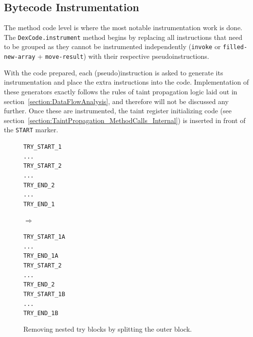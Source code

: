 \documentclass[12pt,twoside,notitlepage]{report}
\newcommand{\asm}[1] {\texttt{#1}}
\begin{document}
\subsection{Bytecode Instrumentation}

The method code level is where the most notable instrumentation work is done. The \verb$DexCode.instrument$ method begins by replacing all instructions that need to be grouped as they cannot be instrumented independently (\verb$invoke$ or \verb$filled-new-array$ + \verb$move-result$) with their respective pseudoinstructions. 

With the code prepared, each (pseudo)instruction is asked to generate its instrumentation and place the extra instructions into the code. Implementation of these generators exactly follows the rules of taint propagation logic laid out in section~\ref{section:DataFlowAnalysis}, and therefore will not be discussed any further. Once these are instrumented, the taint register initializing code (see section~\ref{section:TaintPropagation_MethodCalls_Internal}) is inserted in front of the \verb$START$ marker.

\begin{figure}
	\centering
	\begin{minipage}{0.165\textwidth}
		\asm{TRY\_START\_1} \\
		\asm{...} \\
		\asm{TRY\_START\_2} \\
		\asm{...} \\
		\asm{TRY\_END\_2} \\
		\asm{...} \\
		\asm{TRY\_END\_1}
	\end{minipage}
	\begin{minipage}{0.09\textwidth}
	\centering
	$\Rightarrow$
	\end{minipage}
	\begin{minipage}{0.18\textwidth}
		\asm{TRY\_START\_1A} \\
		\asm{...} \\
		\asm{TRY\_END\_1A} \\
		\asm{TRY\_START\_2} \\
		\asm{...} \\
		\asm{TRY\_END\_2} \\
		\asm{TRY\_START\_1B} \\
		\asm{...} \\
		\asm{TRY\_END\_1B}
	\end{minipage}
	\caption{Removing nested try blocks by splitting the outer block.}
	\label{figure:Instrumentation_TryBlockSplitting}
\end{figure}
\end{document}
